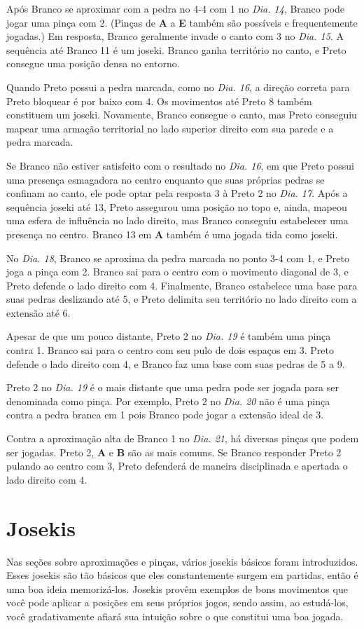 Após Branco se aproximar com a pedra no 4-4 com 1 no \emph{Dia. 14}, Branco pode jogar uma pinça com 2. (Pinças de \textbf{A} a \textbf{E} também são possíveis e frequentemente jogadas.) Em resposta, Branco geralmente invade o canto com 3 no \emph{Dia. 15}. A sequência até Branco 11 é um joseki. Branco ganha território no canto, e Preto consegue uma posição densa no entorno.

Quando Preto possui a pedra marcada, como no \emph{Dia. 16}, a direção correta para Preto bloquear é por baixo com 4. Os movimentos até Preto 8 também constituem um joseki. Novamente, Branco consegue o canto, mas Preto conseguiu mapear uma armação territorial no lado superior direito com sua parede e a pedra marcada.

Se Branco não estiver satisfeito com o resultado no \emph{Dia. 16}, em que Preto possui uma presença esmagadora no centro enquanto que suas próprias pedras se confinam ao canto, ele pode optar pela resposta 3 à Preto 2 no \emph{Dia. 17}. Após a sequência joseki até 13, Preto assegurou uma posição no topo e, ainda, mapeou uma esfera de influência no lado direito, mas Branco conseguiu estabelecer uma presença no centro. Branco 13 em \textbf{A} também é uma jogada tida como joseki.

No \emph{Dia. 18}, Branco se aproxima da pedra marcada no ponto 3-4 com 1, e Preto joga a pinça com 2. Branco sai para o centro com o movimento diagonal de 3, e Preto defende o lado direito com 4. Finalmente, Branco estabelece uma base para suas pedras deslizando até 5, e Preto delimita seu território no lado direito com a extensão até 6.

Apesar de que um pouco distante, Preto 2 no \emph{Dia. 19} é também uma pinça contra 1. Branco sai para o centro com seu pulo de dois espaços em 3. Preto defende o lado direito com 4, e Branco faz uma base com suas pedras de 5 a 9.

Preto 2 no \emph{Dia. 19} é o mais distante que uma pedra pode ser jogada para ser denominada como pinça. Por exemplo, Preto 2 no \emph{Dia. 20} não é uma pinça contra a pedra branca em 1 pois Branco pode jogar a extensão ideal de 3.

Contra a aproximação alta de Branco 1 no \emph{Dia. 21}, há diversas pinças que podem ser jogadas. Preto 2, \textbf{A} e \textbf{B} são as mais comuns. Se Branco responder Preto 2 pulando ao centro com 3, Preto defenderá de maneira disciplinada e apertada o lado direito com 4.

\section{Josekis}

Nas seções sobre aproximações e pinças, vários josekis básicos foram introduzidos. Esses josekis são tão básicos que eles constantemente surgem em partidas, então é uma boa ideia memorizá-los. Josekis provêm exemplos de bons movimentos que você pode aplicar a posições em seus próprios jogos, sendo assim, ao estudá-los, você gradativamente afiará sua intuição sobre o que constitui uma boa jogada.

